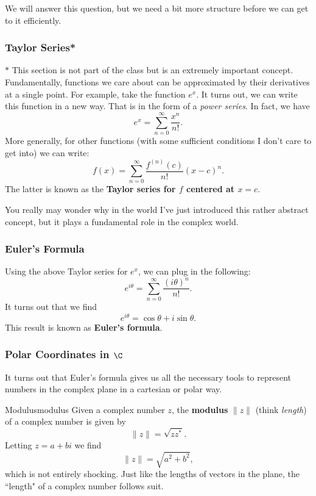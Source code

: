         We will answer this question, but we need a bit more structure before we can get to it efficiently.
        
        \subsubsection{Taylor Series*}
        $*$ This section is not part of the class but is an extremely important concept.  Fundamentally, functions we care about can be approximated by their derivatives at a single point. For example, take the function $e^x$.  It turns out, we can write this function in a new way.  That is in the form of a \emph{power series}. In fact, we have 
        \[
        e^x = \sum_{n=0}^\infty \frac{x^n}{n!}.
        \]
        More generally, for other functions (with some sufficient conditions I don't care to get into) we can write:
        \[
        f(x)=\sum_{n=0}^\infty \frac{f^{(n)}(c)}{n!}(x-c)^n.
        \]
        The latter is known as the \textbf{Taylor series for $f$ centered at $x=c$}.
        
        You really may wonder why in the world I've just introduced this rather abstract concept, but it plays a fundamental role in the complex world.
        
        \subsubsection{Euler's Formula}
        Using the above Taylor series for $e^x$, we can plug in the following:
        \[
        e^{i\theta}=\sum_{n=0}^\infty \frac{(i\theta)^n}{n!}.
        \]
        It turns out that we find
        \[
        e^{i\theta} = \cos \theta + i \sin \theta.
        \]
        This result is known as \textbf{Euler's formula}. 
        
        \subsubsection{Polar Coordinates in $\C$}
        It turns out that Euler's formula gives us all the necessary tools to represent numbers in the complex plane in a cartesian or polar way.  
        
        \begin{df}{Modulus}{modulus}
        Given a complex number $z$, the \textbf{modulus} $\|z\|$ (think \emph{length}) of a complex number is given by
        \[
        \|z\|=\sqrt{zz^*}.
        \]
        Letting $z=a+bi$ we find
        \[
        \|z\|=\sqrt{a^2+b^2},
        \]
        which is not entirely shocking.  Just like the lengths of vectors in the plane, the ``length" of a complex number follows suit.
        \end{df}
        
